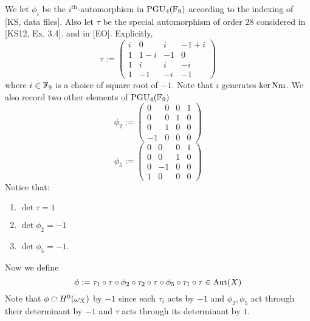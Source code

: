 \documentclass[12pt]{article}
\begin{document}
We let $\phi_i$ be the $i^{\text{th}}$-automorphism in $\mathrm{PGU}_4(\mathbb{F}_9)$ according to the indexing of [KS, data files]. Also let $\tau$ be the special automorphism of order $28$ considered in [KS12, Ex. 3.4]. and in [EO].
Explicitly,
\begin{equation}
\tau :=
\begin{pmatrix}
i & 0 & i & -1 + i
\\
1 & 1 -i & -1 & 0
\\
1 & i & i & -i
\\
1 & -1 & -i & -1
\end{pmatrix}
\end{equation}
where $i \in \mathbb{F}_9$ is a choice of square root of $-1$. Note that $i$ generates $\ker{\mathrm{Nm}}$. We also record two other elements of $\mathrm{PGU}_4(\mathbb{F}_9)$
\begin{equation}
\phi_2 :=
\begin{pmatrix}
0 & 0 & 0 & 1
\\
0 & 0 & 1 & 0
\\
0 & 1 & 0 & 0
\\
-1 & 0 & 0 & 0
\end{pmatrix}
\end{equation}
\begin{equation}
\phi_5 :=
\begin{pmatrix}
0 & 0 & 0 & 1
\\
0 & 0 & 1 & 0
\\
0 & -1 & 0 & 0
\\
1 & 0 & 0 & 0
\end{pmatrix}
\end{equation}
Notice that:
\begin{enumerate}
\item $\det{\tau} = 1$
\item $\det{\phi_2} = -1$
\item $\det{\phi_5 } = -1$.
\end{enumerate}

Now we define
\[ \phi := \tau_1 \circ \tau \circ \phi_2 \circ \tau_2 \circ \tau \circ \phi_5 \circ \tau_1 \circ \tau \in \mathrm{Aut}(X) \]
Note that $\phi \acts H^0(\omega_X)$ by $-1$ since each $\tau_i$ acts by $-1$ and $\phi_2, \phi_5$ act through their determinant by $-1$ and $\tau$ acts through its determinant by $1$.
\end{document}
